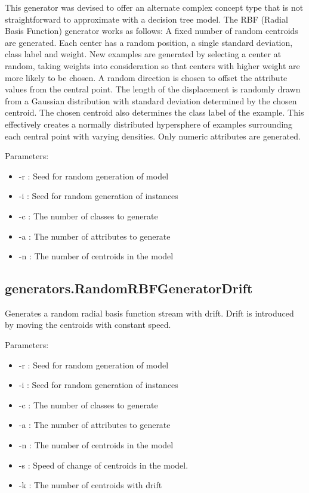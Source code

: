 \documentclass[a4paper,12pt,twoside]{book}
\begin{document}
This generator was devised to offer an alternate complex concept type that is not 
straightforward to approximate with a decision tree model.
The RBF (Radial Basis Function) generator works as follows: A fixed number
of random centroids are generated. Each center has a random position,
a single standard deviation, class label and weight. New examples are 
generated by selecting a center at random, taking weights into consideration so
that centers with higher weight are more likely to be chosen. A random 
direction is chosen to offset the attribute values from the central point. The
length of the displacement is randomly drawn from a Gaussian distribution
with standard deviation determined by the chosen centroid. The chosen 
centroid also determines the class label of the example. This effectively creates a
normally distributed hypersphere of examples surrounding each central point
with varying densities. Only numeric attributes are generated. 


Parameters:

\begin{itemize}
\item -r : Seed for random generation of model
\item -i : Seed for random generation of instances
\item -c : The number of classes to generate
\item -a : The number of attributes to generate
\item -n : The number of centroids in the model\end{itemize}



\subsection{generators.RandomRBFGeneratorDrift} Generates a random radial basis function stream with drift.
Drift is introduced by moving the centroids with constant speed. 

Parameters:

\begin{itemize}
\item -r : Seed for random generation of model
\item -i : Seed for random generation of instances
\item -c : The number of classes to generate
\item -a : The number of attributes to generate
\item -n : The number of centroids in the model
\item -s : Speed of change of centroids in the model.
\item -k : The number of centroids with drift\end{itemize}
\end{document}
